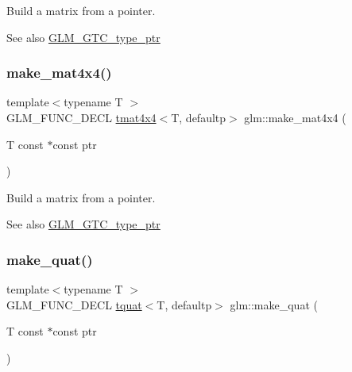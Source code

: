 Build a matrix from a pointer. \begin{DoxySeeAlso}{See also}
\hyperlink{group__gtc__type__ptr}{G\+L\+M\+\_\+\+G\+T\+C\+\_\+type\+\_\+ptr} 
\end{DoxySeeAlso}
\mbox{\label{group__gtc__type__ptr_gaf605a5f5e2ff594e8d404b2855b09541}} 
\subsubsection{\texorpdfstring{make\+\_\+mat4x4()}{make\_mat4x4()}}
{\footnotesize\ttfamily template$<$typename T $>$ \\
G\+L\+M\+\_\+\+F\+U\+N\+C\+\_\+\+D\+E\+CL \hyperlink{structglm_1_1tmat4x4}{tmat4x4}$<$T, defaultp$>$ glm\+::make\+\_\+mat4x4 (\begin{DoxyParamCaption}\item[{T const $\ast$const}]{ptr }\end{DoxyParamCaption})}

Build a matrix from a pointer. \begin{DoxySeeAlso}{See also}
\hyperlink{group__gtc__type__ptr}{G\+L\+M\+\_\+\+G\+T\+C\+\_\+type\+\_\+ptr} 
\end{DoxySeeAlso}
\mbox{\label{group__gtc__type__ptr_gaadafb6600af2633e4c98cc64c72f5269}} 
\subsubsection{\texorpdfstring{make\+\_\+quat()}{make\_quat()}}
{\footnotesize\ttfamily template$<$typename T $>$ \\
G\+L\+M\+\_\+\+F\+U\+N\+C\+\_\+\+D\+E\+CL \hyperlink{structglm_1_1tquat}{tquat}$<$T, defaultp$>$ glm\+::make\+\_\+quat (\begin{DoxyParamCaption}\item[{T const $\ast$const}]{ptr }\end{DoxyParamCaption})}

